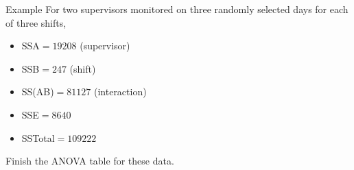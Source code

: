 \begin{frame}{Example}
    For two supervisors monitored on three randomly selected days for each of three shifts,
    \begin{itemize}
        \item SSA$=19208$ (supervisor)
        \item SSB$=247$ (shift)
        \item SS(AB)$=81127$ (interaction)
        \item SSE$=8640$
        \item SSTotal$=109222$
    \end{itemize}
    Finish the ANOVA table for these data.
\end{frame}
